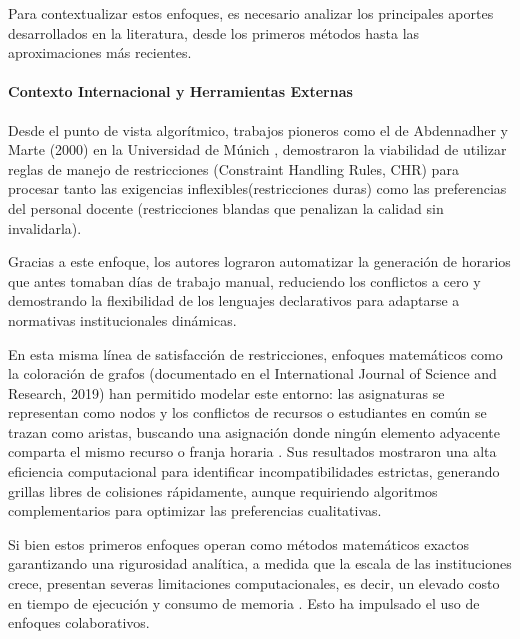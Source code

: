 \documentclass{article}
\begin{document}
Para contextualizar estos enfoques, es necesario analizar los principales aportes desarrollados en la literatura, desde los primeros métodos hasta las aproximaciones más recientes.

\paragraph{Contexto Internacional y Herramientas Externas}
Desde el punto de vista algorítmico, trabajos pioneros como el de Abdennadher y Marte (2000) en la Universidad de Múnich \cite{abdennadher2000}, demostraron la viabilidad de utilizar reglas de manejo de restricciones (Constraint Handling Rules, CHR) para procesar tanto las exigencias inflexibles(restricciones duras) como las preferencias del personal docente (restricciones blandas que penalizan la calidad sin invalidarla). 

Gracias a este enfoque, los autores lograron automatizar la generación de horarios que antes tomaban días de trabajo manual, reduciendo los conflictos a cero y demostrando la flexibilidad de los lenguajes declarativos para adaptarse a normativas institucionales dinámicas.

En esta misma línea de satisfacción de restricciones, enfoques matemáticos como la coloración de grafos (documentado en el International Journal of Science and Research, 2019) \cite{reddy2019} han permitido modelar este entorno:  las asignaturas se representan como
nodos y los conflictos de recursos o estudiantes en común se trazan como aristas, buscando una asignación donde ningún elemento adyacente comparta el mismo recurso o franja horaria \cite{reddy2019}. Sus resultados mostraron una alta eficiencia computacional para identificar incompatibilidades estrictas, generando grillas libres de colisiones rápidamente, aunque requiriendo algoritmos complementarios para optimizar las preferencias cualitativas.

Si bien estos primeros enfoques operan como métodos matemáticos exactos garantizando una rigurosidad analítica, a medida que la escala de las instituciones crece, presentan severas limitaciones computacionales, es decir, un elevado costo en tiempo de ejecución y consumo de memoria \cite{babaei2015}. Esto ha impulsado el uso de enfoques colaborativos. 
\end{document}
